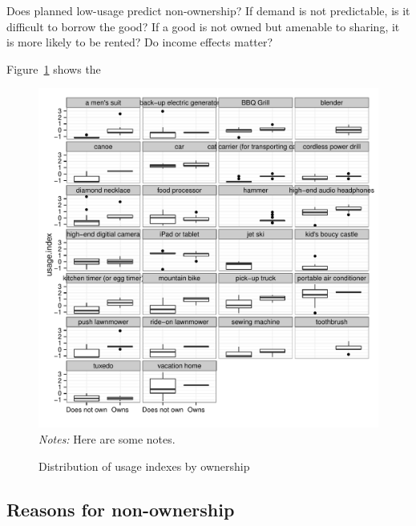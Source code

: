 \documentclass[11pt]{article}
\begin{document}
Does planned low-usage predict non-ownership? 
If demand is not predictable, is it difficult to borrow the good? 
If a good is not owned but amenable to sharing, it is more likely to be rented? 
Do income effects matter? 

Figure~\ref{fig:usage_by_own} shows the 

\begin{figure}
\centering 
\caption{Distribution of usage indexes by ownership}
\label{fig:usage_by_own}
\begin{minipage}{0.90 \linewidth}
\includegraphics[width = \linewidth]{./plots/usage_by_own.pdf} 
\\
{\footnotesize
\emph{Notes:} Here are some notes. 
}
\end{minipage} 
\end{figure} 



\subsection{Reasons for non-ownership} 
\end{document}
